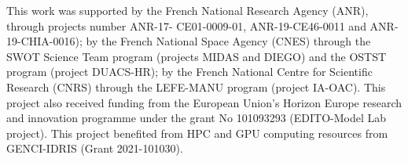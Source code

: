 \begin{ack}
This work was supported by the French National Research Agency (ANR), through projects number ANR-17- CE01-0009-01, ANR-19-CE46-0011 and ANR-19-CHIA-0016); by the French National Space Agency (CNES) through the SWOT Science Team program (projects MIDAS and DIEGO) and the OSTST program (project DUACS-HR); by the French National Centre for Scientific Research (CNRS) through the LEFE-MANU program (project IA-OAC). This project also received funding from the European Union’s Horizon Europe research and innovation programme under the grant No 101093293 (EDITO-Model Lab project). This project benefited from HPC and GPU computing resources from GENCI-IDRIS (Grant 2021-101030).
\end{ack}